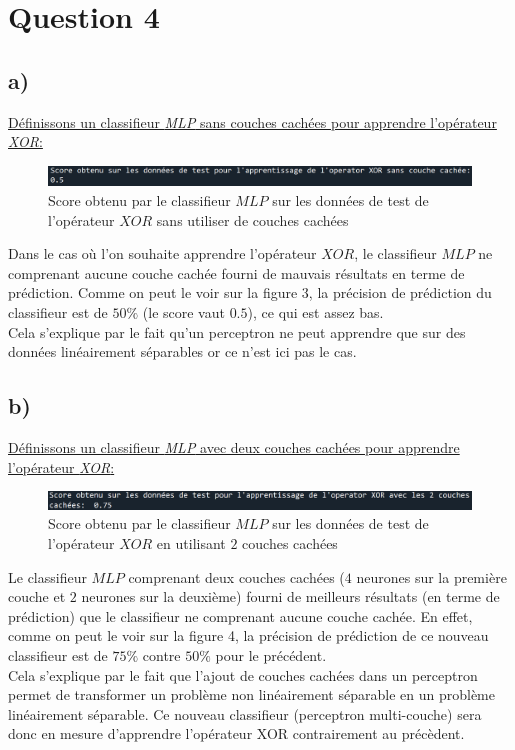\documentclass[frenchb]{report}
\newcommand{\1}{\mathbbm{1}}
\theoremstyle{definition}\newtheorem{defn}{Définition}
\theoremstyle{definition}\newtheorem{exm}{Exemple}
\theoremstyle{definition}\newtheorem{nota}{Notation}
\theoremstyle{definition}\newtheorem{rem}{Remarque}
\begin{document}
\section*{Question 4}
\subsection{a)}

\underline{Définissons un classifieur \textit{MLP} sans couches cachées pour apprendre l’opérateur \textit{XOR}:}

\begin{figure}[H]
	\centering
	\includegraphics[scale=0.7]{images/Q4a.png}
	\caption{Score obtenu par le classifieur $MLP$ sur les données de test de l'opérateur $XOR$ sans utiliser de couches cachées}
\end{figure}
Dans le cas où l'on souhaite apprendre l'opérateur $XOR$, le classifieur $MLP$ ne comprenant aucune couche cachée fourni de mauvais résultats en terme de prédiction. Comme on peut le voir sur la figure 3, la précision de prédiction du classifieur est de $50\%$ (le score vaut $0.5$), ce qui est assez bas.\\
Cela s'explique par le fait qu'un perceptron ne peut apprendre que sur des données linéairement séparables or ce n'est ici pas le cas.

\subsection{b)}

\underline{Définissons un classifieur \textit{MLP} avec deux couches cachées pour apprendre l’opérateur \textit{XOR}:}


\begin{figure}[H]
	\centering
	\includegraphics[scale=0.7]{images/Q4b.png}
	\caption{Score obtenu par le classifieur $MLP$ sur les données de test de l'opérateur $XOR$ en utilisant $2$ couches cachées}
\end{figure}
Le classifieur $MLP$ comprenant deux couches cachées ($4$ neurones sur la première couche et $2$ neurones sur la deuxième) fourni de meilleurs résultats (en terme de prédiction) que le classifieur ne comprenant aucune couche cachée. En effet, comme on peut le voir sur la figure 4, la précision de prédiction de ce nouveau classifieur est de $75\%$ contre $50\%$ pour le précédent.\\
Cela s'explique par le fait que l'ajout de couches cachées dans un perceptron permet de transformer un problème non linéairement séparable en un problème linéairement séparable. Ce nouveau classifieur (perceptron multi-couche) sera donc en mesure d'apprendre l'opérateur XOR contrairement au précèdent.
\end{document}
